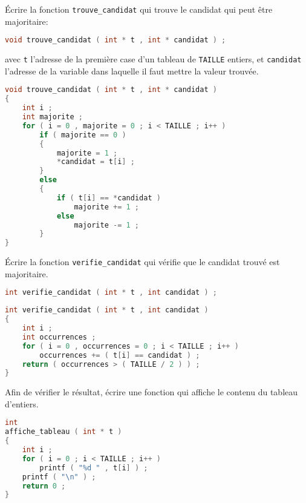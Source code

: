 \question Écrire la fonction \texttt{trouve\_candidat} qui trouve
le candidat qui peut être majoritaire: 
\begin{lstlisting}[language=C]
void trouve_candidat ( int * t , int * candidat ) ;  
\end{lstlisting}
avec \texttt{t} l'adresse de la première case d'un tableau de
\texttt{TAILLE} entiers, et \texttt{candidat} l'adresse de la variable
dans laquelle il faut mettre la valeur trouvée.

\begin{solutioncachee}
  \begin{lstlisting}[language=C]
void trouve_candidat ( int * t , int * candidat )
{
    int i ;
    int majorite ;
    for ( i = 0 , majorite = 0 ; i < TAILLE ; i++ )
        if ( majorite == 0 )
        {
            majorite = 1 ;
            *candidat = t[i] ;
        }
        else
        {
            if ( t[i] == *candidat )
                majorite += 1 ;
            else
                majorite -= 1 ;
        }
}    
  \end{lstlisting}
\end{solutioncachee}

\question Écrire la fonction \texttt{verifie\_candidat} qui vérifie
que le candidat trouvé est majoritaire.
\begin{lstlisting}[language=C]
int verifie_candidat ( int * t , int candidat ) ;  
\end{lstlisting}

\begin{solutioncachee}
  \begin{lstlisting}[language=C]
int verifie_candidat ( int * t , int candidat )
{
    int i ;
    int occurrences ;
    for ( i = 0 , occurrences = 0 ; i < TAILLE ; i++ )
        occurrences += ( t[i] == candidat ) ;
    return ( occurrences > ( TAILLE / 2 ) ) ;
}    
  \end{lstlisting}
\end{solutioncachee}

\question Afin de vérifier le résultat, écrire une fonction qui
affiche le contenu du tableau d'entiers.

\begin{solutioncachee}
  \begin{lstlisting}[language=C]
int
affiche_tableau ( int * t )
{
    int i ;
    for ( i = 0 ; i < TAILLE ; i++ )
        printf ( "%d " , t[i] ) ;
    printf ( "\n" ) ;
    return 0 ;
}
  \end{lstlisting}
\end{solutioncachee}

